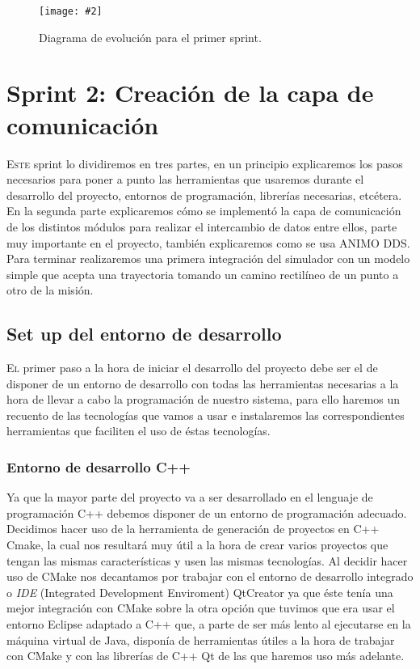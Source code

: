 \documentclass[12pt,a4paper,spanish]{book} %
\newcommand{\imgCentradaGrande}[3]{
\begin{figure}[H]
\begin{center}
\texttt{[image: \#2]}
\caption{#3}
\label{#1}
\end{center}
\end{figure}
}
\begin{document}
\imgCentradaGrande{fig.4.10}{img/diagevolucion1.eps}{Diagrama de evolución para el primer sprint.}


\newpage
\section{Sprint 2: Creación de la capa de comunicación}

\lettrine{E}{ste} sprint lo dividiremos en tres partes, en un principio explicaremos los pasos necesarios para poner a punto las herramientas que usaremos durante el desarrollo del proyecto, entornos de programación, librerías necesarias, etcétera. En la segunda parte explicaremos cómo se implementó la capa de comunicación de los distintos módulos para realizar el intercambio de datos entre ellos, parte muy importante en el proyecto, también explicaremos como se usa ANIMO DDS. Para terminar realizaremos una primera integración del simulador con un modelo simple que acepta una trayectoria tomando un camino rectilíneo de un punto a otro de la misión.

\subsection{Set up del entorno de desarrollo}

\lettrine{E}{l} primer paso a la hora de iniciar el desarrollo del proyecto debe ser el de disponer de un entorno de desarrollo con todas las herramientas necesarias a la hora de llevar a cabo la programación de nuestro sistema, para ello haremos un recuento de las tecnologías que vamos a usar e instalaremos las correspondientes herramientas que faciliten el uso de éstas tecnologías.

\subsubsection{Entorno de desarrollo C++}

Ya que la mayor parte del proyecto va a ser desarrollado en el lenguaje de programación C++ debemos disponer de un entorno de programación adecuado. Decidimos hacer uso de la herramienta de generación de proyectos en C++ Cmake, la cual nos resultará muy útil a la hora de crear varios proyectos que tengan las mismas características y usen las mismas tecnologías. Al decidir hacer uso de CMake nos decantamos por trabajar con el entorno de desarrollo integrado o \emph{IDE} (Integrated Development Enviroment) QtCreator ya que éste tenía una mejor integración con CMake sobre la otra opción que tuvimos que era usar el entorno Eclipse adaptado a C++ que, a parte de ser más lento al ejecutarse en la máquina virtual de Java, disponía de herramientas útiles a la hora de trabajar con CMake y con las librerías de C++ Qt de las que haremos uso más adelante.
\end{document}
